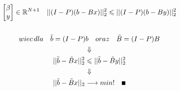 \documentclass[a4paper]{article}
\renewcommand{\le}{\leqslant} %
\renewcommand\qedsymbol{\scalebox{0.75}{$\blacksquare$}} %
\newcommand{\R}{\mathbb R} %
\begin{document}
\begin{enumerate}[label=(\alph*)]
\begin{gather*}
\begin{bmatrix}
                  \beta \\
                  y \\
               \end{bmatrix}
               \in \R^{N + 1} \quad
               ||(I - P)(b - B x)||_{2}^{2}
               \le
               ||(I - P)(b - B y)||_{2}^{2} \\
               \\
               wiec \, dla \quad \tilde{b} = (I - P)b \quad oraz \quad \tilde{B} = (I - P)B \\
               \Downarrow \\
               ||\tilde{b} - \tilde{B}x||_{2}^{2} \le ||\tilde{b} - \tilde{B}y||_{2}^{2} \\
               \Downarrow \\
               ||\tilde{b} - \tilde{B}x||_{2} \longrightarrow min! \quad \qedsymbol
            \end{gather*} \\


\end{enumerate}
\end{document}
